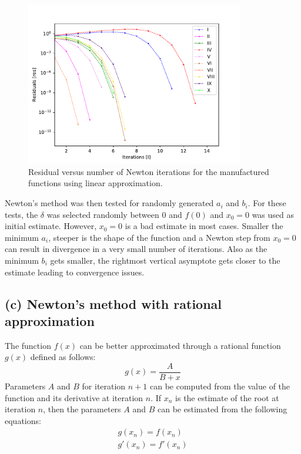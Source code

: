 \documentclass[11pt, oneside]{article}
\begin{document}
	\begin{figure}[htbp]
		\begin{center}
		\includegraphics[width=0.85\textwidth]{figure/Newton_Test.pdf}
		\caption{Residual versus number of Newton iterations for the manufactured functions using linear approximation.}
		\label{fig:residuals_newton}
		\end{center}
	\end{figure}


Newton's method was then tested for randomly generated $a_i$ and $b_i$. For these tests, the  $\delta$ was selected randomly between $0$ and $f(0)$ and $x_0=0$ was used as initial estimate. However, $x_0=0$ is a bad estimate in most cases. Smaller the minimum $a_i$, steeper is the shape of the function and a Newton step from $x_0 = 0$ can result in divergence in a very small number of iterations. Also as  the minimum $b_i$ gets smaller, the rightmost vertical asymptote gets closer to the estimate leading to convergence issues.

\subsection*{(c) Newton's method with rational approximation}	
	The function $f(x)$ can be better approximated through a rational function $g(x)$ defined as follows:
	\begin{equation}
		g(x) = \frac{A}{B+x}
	\end{equation}
	Parameters $A$ and $B$ for iteration $n+1$  can be computed from the value of the function and its derivative at iteration $n$. If $x_n$ is the estimate of the root at iteration $n$, then the parameters  $A$ and $B$ can be estimated from the following equations:
	\begin{align}
		g(x_n) = f(x_n) \\
		g'(x_n) = f'(x_n) \\
	\end{align}
	
\end{document}
